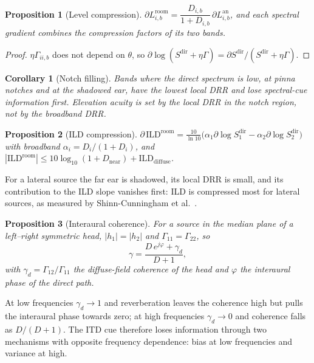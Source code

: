 \documentclass[10pt]{article}
\newtheorem{proposition}{Proposition}
\newtheorem{corollary}{Corollary}
\theoremstyle{definition}
\begin{document}
\begin{proposition}[Level compression]\label{prop:mon}
$\partial L^{\mathrm{room}}_{i,b}=\dfrac{D_{i,b}}{1+D_{i,b}}\,\partial L^{\mathrm{an}}_{i,b}$, and each spectral gradient combines the compression factors of its two bands.
\end{proposition}
\begin{proof}
$\eta\Gamma_{ii,b}$ does not depend on $\theta$, so $\partial\log(S^{\mathrm{dir}}+\eta\Gamma)=\partial S^{\mathrm{dir}}/(S^{\mathrm{dir}}+\eta\Gamma)$.
\end{proof}
\begin{corollary}[Notch filling]
Bands where the direct spectrum is low, at pinna notches and at the shadowed ear, have the lowest local DRR and lose spectral-cue information first. Elevation acuity is set by the local DRR in the notch region, not by the broadband DRR.
\end{corollary}

\begin{proposition}[ILD compression]\label{prop:ild}
$\partial\,\mathrm{ILD}^{\mathrm{room}}=\frac{10}{\ln10}\big(\alpha_1\partial\log S_1^{\mathrm{dir}}-\alpha_2\partial\log S_2^{\mathrm{dir}}\big)$ with broadband $\alpha_i=D_i/(1+D_i)$, and $|\mathrm{ILD}^{\mathrm{room}}|\le10\log_{10}(1+D_{\mathrm{near}})+\mathrm{ILD}_{\mathrm{diffuse}}$.
\end{proposition}
For a lateral source the far ear is shadowed, its local DRR is small, and its contribution to the ILD slope vanishes first: ILD is compressed most for lateral sources, as measured by Shinn-Cunningham et al.~\cite{shinn2005}.

\begin{proposition}[Interaural coherence]\label{prop:coh}
For a source in the median plane of a left--right symmetric head, $|h_1|=|h_2|$ and $\Gamma_{11}=\Gamma_{22}$, so
\begin{equation}
\gamma=\frac{D\,e^{j\varphi}+\gamma_d}{D+1},
\end{equation}
with $\gamma_d=\Gamma_{12}/\Gamma_{11}$ the diffuse-field coherence of the head and $\varphi$ the interaural phase of the direct path.
\end{proposition}
At low frequencies $\gamma_d\to1$ and reverberation leaves the coherence high but pulls the interaural phase towards zero; at high frequencies $\gamma_d\to0$ and coherence falls as $D/(D+1)$. The ITD cue therefore loses information through two mechanisms with opposite frequency dependence: bias at low frequencies and variance at high.
\end{document}
